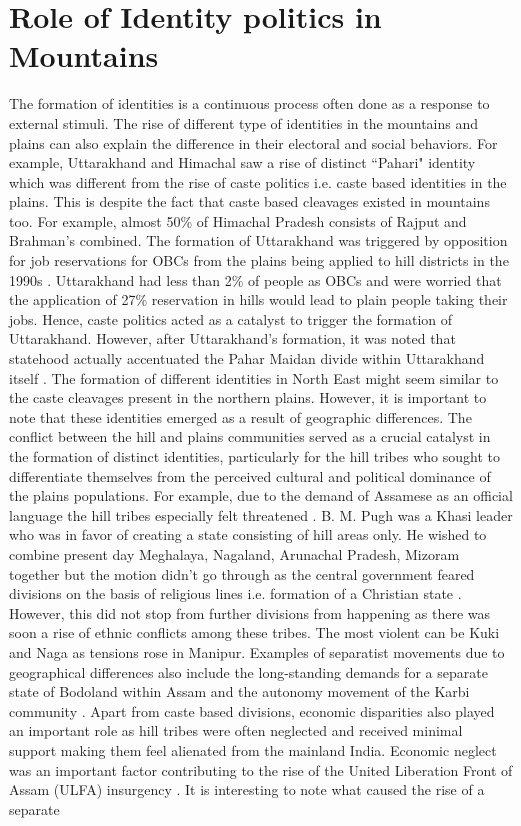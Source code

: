 \section{Role of Identity politics in Mountains}
\begin{sloppypar}
The formation of identities is a continuous process often done as a response to external stimuli. The rise of different type of identities in the mountains and plains can also explain the difference in their electoral and social behaviors. For example, Uttarakhand and Himachal saw a rise of distinct ``Pahari" identity \citep{mishra2000politics} which was different from the rise of caste politics i.e. caste based identities in the plains. This is despite the fact that caste based cleavages existed in mountains too. For example, almost 50\% of Himachal Pradesh consists of Rajput and Brahman's combined. The formation of Uttarakhand was triggered by opposition for job reservations for OBCs from the plains being applied to hill districts in the 1990s \citep{mishra2000politics}. Uttarakhand had less than 2\% of people as OBCs and were worried that the application of 27\% reservation in hills would lead to plain people taking their jobs. Hence, caste politics acted as a catalyst to trigger the formation of Uttarakhand. However, after Uttarakhand's formation, it was noted that statehood actually accentuated the Pahar Maidan divide within Uttarakhand itself \citep{mathur2015remote}. The formation of different identities in North East might seem similar to the caste cleavages present in the northern plains. However, it is important to note that these identities emerged as a result of geographic differences. The conflict between the hill and plains communities served as a crucial catalyst in the formation of distinct identities, particularly for the hill tribes who sought to differentiate themselves from the perceived cultural and political dominance of the plains populations. For example, due to the demand of Assamese as an official language the hill tribes especially felt threatened \citep{inoue2005integration}.  B. M. Pugh was a Khasi leader who was in favor of creating a state consisting of hill areas only. He wished to combine present day Meghalaya, Nagaland, Arunachal Pradesh, Mizoram together but the motion didn't go through as the central government feared divisions on the basis of religious lines i.e. formation of a Christian state \citep{karlsson2013evading}. However, this did not stop from further divisions from happening as there was soon a rise of ethnic conflicts among these tribes. The most violent can be Kuki and Naga as tensions rose in Manipur. Examples of separatist movements due to geographical differences also include the long\hyp{}standing demands for a separate state of Bodoland within Assam  and the autonomy movement of the Karbi community \citep{sarma2017bodoland}. Apart from caste based divisions, economic disparities also played an important role as hill tribes were often neglected and received minimal support making them feel alienated from the mainland India. Economic neglect was an important factor contributing to the rise of the United Liberation Front of Assam (ULFA) insurgency \citep{chima2023insurgency}. It is interesting to note what caused the rise of a separate 
\end{sloppypar}
